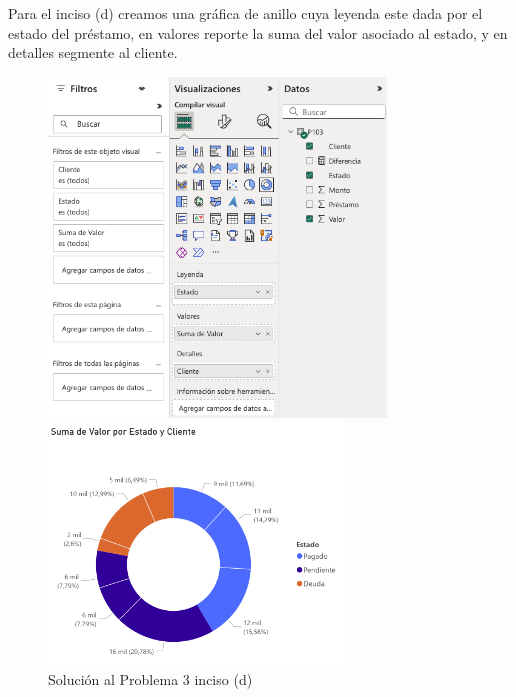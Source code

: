 \documentclass{article}
\begin{document}
\noindent
Para el inciso (d) creamos una gráfica de anillo cuya leyenda este dada por el estado del préstamo, en valores reporte la suma del valor asociado al estado, y en detalles segmente al cliente.
\begin{figure}[!ht]
    \centering
    \begin{minipage}{\textwidth}
        \centering
        \includegraphics[width=0.8\textwidth]{figures/s103d-1.png}
    \end{minipage}
    \hfill
    \begin{minipage}{\textwidth}
        \centering
        \includegraphics[width=0.7\textwidth]{figures/s103d-2.png}
    \end{minipage}
    \captionsetup{width=0.9\textwidth}
    \caption{Solución al Problema 3 inciso (d)}
    \label{fig:s103d}
\end{figure}
\end{document}
